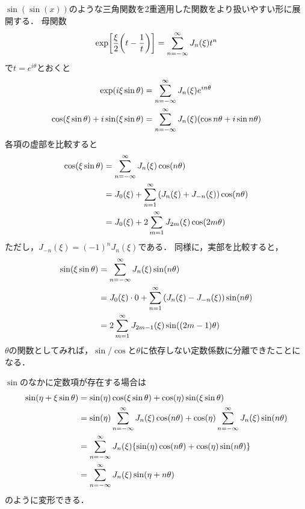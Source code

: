\documentclass[dvipdfmx,autodetect-engine,12pt,fleqn]{jsarticle}
\begin{document}
$\sin(\sin(x))$のような三角関数を2重適用した関数をより扱いやすい形に展開する．
母関数
\begin{equation*}
    \exp\sbra*{\frac{\xi}{2}\qty(t-\frac{1}{t})} = \sum_{n=-\infty}^\infty J_n(\xi)t^n
\end{equation*}
で$t=e^{i\theta}$とおくと
\begin{equation}
\begin{split}
    \exp\lparen i\xi \sin\theta\rparen &= \sum_{n=-\infty}^\infty J_n(\xi)e^{in\theta}\\
    \cos\lparen\xi \sin\theta\rparen+i\sin\lparen\xi \sin\theta\rparen &= \sum_{n=-\infty}^\infty J_n(\xi)\lparen\cos{n\theta}+i\sin{n\theta}\rparen
\end{split}
\end{equation}
各項の虚部を比較すると
\begin{equation}
\begin{split}
    \cos\rbra*{\xi \sin\theta} &= \sum_{n=-\infty}^\infty J_n(\xi)\cos\rbra{n\theta}\\
    &= J_0(\xi) + \sum_{n=1}^\infty \qty(J_n(\xi)+J_{-n}(\xi))\cos\rbra{n\theta}\\
    &= J_0(\xi) + 2\sum_{m=1}^\infty J_{2m}(\xi)\cos\rbra{2m\theta}
\end{split}
\end{equation}
ただし，$J_{-n}(\xi)=(-1)^nJ_n(\xi)$である．
同様に，実部を比較すると，
\begin{equation}
\begin{split}
    \sin\rbra*{\xi \sin\theta} &= \sum_{n=-\infty}^\infty J_n(\xi)\sin\rbra{n\theta}\\
    &= J_0(\xi)\cdot 0 + \sum_{n=1}^\infty \qty(J_n(\xi)-J_{-n}(\xi))\sin\rbra{n\theta}\\
    &= 2\sum_{m=1}^\infty J_{2m-1}(\xi)\sin\rbra{(2m-1)\theta}
\end{split}
\end{equation}
$\theta$の関数としてみれば，$\sin$/$\cos$と$\theta$に依存しない定数係数に分離できたことになる．

$\sin$のなかに定数項が存在する場合は
\begin{equation}
\label{eq:bessel-series-sinsin}
\begin{split}
    \sin\rbra*{\eta + \xi \sin\theta} &= \sin(\eta)\cos(\xi\sin\theta)+\cos(\eta)\sin(\xi\sin\theta)\\
    &= \sin(\eta)\sum_{n=-\infty}^\infty J_n(\xi)\cos(n\theta) + \cos(\eta)\sum_{n=-\infty}^\infty J_n(\xi)\sin(n\theta)\\
    &= \sum_{n=-\infty}^\infty J_n(\xi) \qty{\sin(\eta)\cos(n\theta) + \cos(\eta)\sin(n\theta)}\\
    &= \sum_{n=-\infty}^\infty J_n(\xi) \sin\rbra*{\eta + n\theta}
\end{split}
\end{equation}
のように変形できる．
\end{document}
